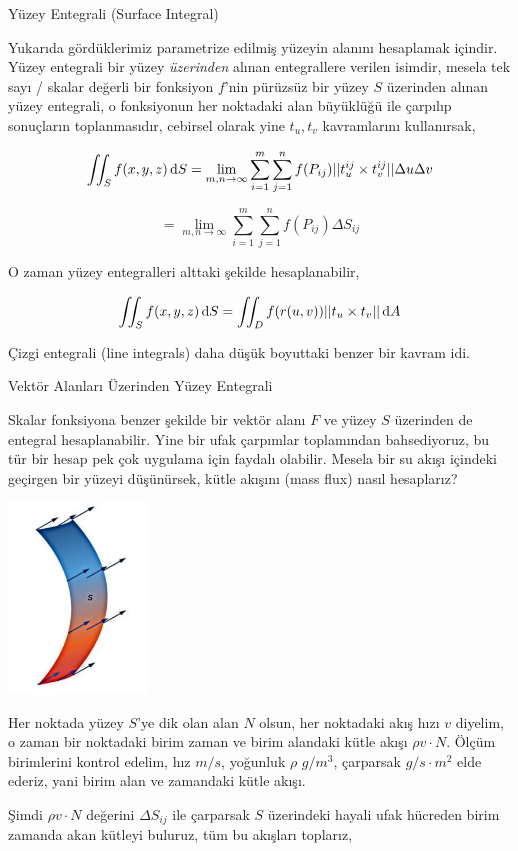 \documentclass[12pt,fleqn]{article}\usepackage{../../common}
\begin{document}
Yüzey Entegrali (Surface Integral)

Yukarıda gördüklerimiz parametrize edilmiş yüzeyin alanını hesaplamak içindir.
Yüzey entegrali bir yüzey {\em üzerinden} alınan entegrallere verilen isimdir,
mesela tek sayı / skalar değerli bir fonksiyon $f$'nin pürüzsüz bir yüzey $S$
üzerinden alınan yüzey entegrali, o fonksiyonun her noktadaki alan büyüklüğü ile
çarpılıp sonuçların toplanmasıdır, cebirsel olarak yine $t_u,t_v$ kavramlarını
kullanırsak,

$$
\iint_S f(x,y,z) \,\mathrm{d} S 
= \lim_{m,n \to \infty} \sum_{i=1}^{m} \sum_{j=1}^{n} f(P_{ij}) || t_u^{ij} \times t_v^{ij} || \Delta u \Delta v
$$

$$
= \lim_{m,n \to \infty} \sum_{i=1}^{m} \sum_{j=1}^{n} f(P_{ij}) \Delta S_{ij} 
$$

O zaman yüzey entegralleri alttaki şekilde hesaplanabilir,

$$
\iint_S f(x,y,z) \,\mathrm{d} S =
\iint_D f(r(u,v)) || t_u \times t_v || \,\mathrm{d} A
$$

Çizgi entegrali (line integrals) daha düşük boyuttaki benzer bir kavram idi.

Vektör Alanları Üzerinden Yüzey Entegrali

Skalar fonksiyona benzer şekilde bir vektör alanı $F$ ve yüzey $S$ üzerinden de
entegral hesaplanabilir. Yine bir ufak çarpımlar toplamından bahsediyoruz, bu
tür bir hesap pek çok uygulama için faydalı olabilir. Mesela bir su akışı
içindeki geçirgen bir yüzeyi düşünürsek, kütle akışını (mass flux) nasıl
hesaplarız? 

\includegraphics[width=10em]{calc_multi_75_app_04.jpg}

Her noktada yüzey $S$'ye dik olan alan $N$ olsun, her noktadaki akış hızı $v$
diyelim, o zaman bir noktadaki birim zaman ve birim alandaki kütle akışı $\rho v
\cdot N$. Ölçüm birimlerini kontrol edelim, hız $m/s$, yoğunluk $\rho$ 
$g/m^3$, çarparsak $g/s \cdot m^2$ elde ederiz, yani birim alan ve zamandaki
kütle akışı.

Şimdi $\rho v \cdot N$ değerini $\Delta S_{ij}$ ile çarparsak $S$ üzerindeki
hayali ufak hücreden birim zamanda akan kütleyi buluruz, tüm bu akışları
toplarız,
\end{document}
